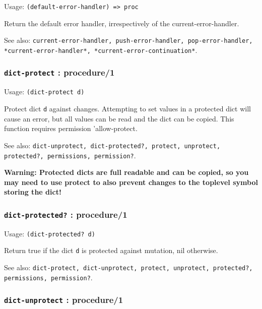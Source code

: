 \documentclass[
]{article}
\newcommand{\passthrough}[1]{#1}
\begin{document}
Usage: \passthrough{\lstinline!(default-error-handler) => proc!}

Return the default error handler, irrespectively of the
current-error-handler.

See also:
\passthrough{\lstinline!current-error-handler, push-error-handler, pop-error-handler, *current-error-handler*, *current-error-continuation*!}.

\hypertarget{dict-protect-procedure1}{%
\subsubsection{\texorpdfstring{\texttt{dict-protect} :
procedure/1}{dict-protect : procedure/1}}\label{dict-protect-procedure1}}

Usage: \passthrough{\lstinline!(dict-protect d)!}

Protect dict \passthrough{\lstinline!d!} against changes. Attempting to
set values in a protected dict will cause an error, but all values can
be read and the dict can be copied. This function requires permission
'allow-protect.

See also:
\passthrough{\lstinline!dict-unprotect, dict-protected?, protect, unprotect, protected?, permissions, permission?!}.

\textbf{Warning: Protected dicts are full readable and can be copied, so
you may need to use protect to also prevent changes to the toplevel
symbol storing the dict!}

\hypertarget{dict-protected-procedure1}{%
\subsubsection{\texorpdfstring{\texttt{dict-protected?} :
procedure/1}{dict-protected? : procedure/1}}\label{dict-protected-procedure1}}

Usage: \passthrough{\lstinline!(dict-protected? d)!}

Return true if the dict \passthrough{\lstinline!d!} is protected against
mutation, nil otherwise.

See also:
\passthrough{\lstinline!dict-protect, dict-unprotect, protect, unprotect, protected?, permissions, permission?!}.

\hypertarget{dict-unprotect-procedure1}{%
\subsubsection{\texorpdfstring{\texttt{dict-unprotect} :
procedure/1}{dict-unprotect : procedure/1}}\label{dict-unprotect-procedure1}}
\end{document}
